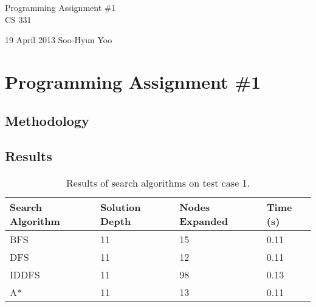 \documentclass[10pt,letterpaper]{article}
\begin{document}
\begin{titlepage}
	\vspace*{4cm}
	\begin{flushright}
	{\huge
		Programming Assignment \#1 \\ [3cm]
	}
	{\large
		CS 331
	}
	\end{flushright}

	\begin{flushright}
		19 April 2013
		Soo-Hyun Yoo
	\end{flushright}
\end{titlepage}

\section*{Programming Assignment \#1}

\subsection*{Methodology}






\subsection*{Results}



\begin{table}[!h]
	\centering
	\begin{tabular}{|l|l|l|l|} \hline
		Search Algorithm & Solution Depth & Nodes Expanded & Time (s) \\ \hline
		BFS   & 11 & 15 & 0.11 \\
		DFS   & 11 & 12 & 0.11 \\
		IDDFS & 11 & 98 & 0.13 \\
		A*    & 11 & 13 & 0.11 \\ \hline
	\end{tabular}
	\caption{Results of search algorithms on test case 1.}
	\label{tbl:case1}
\end{table}
\end{document}
